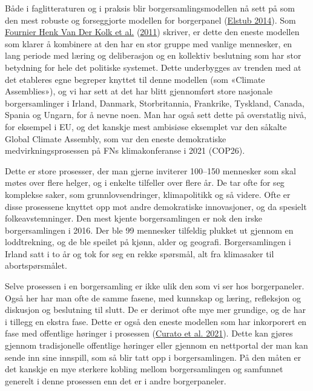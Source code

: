\documentclass[
  12pt,
  a4paper, 12pt]{article}
\begin{document}
Både i faglitteraturen og i praksis blir borgersamlingsmodellen nå sett på som den mest robuste og forseggjorte modellen for borgerpanel (\protect\hyperlink{ref-elstub_mini-publics_2014}{Elstub 2014}). Som \protect\hyperlink{ref-fournier_henk_van_der_kolk_when_2011}{Fournier Henk Van Der Kolk et al.} (\protect\hyperlink{ref-fournier_henk_van_der_kolk_when_2011}{2011}) skriver, er dette den eneste modellen som klarer å kombinere at den har en stor gruppe med vanlige mennesker, en lang periode med læring og deliberasjon og en kollektiv beslutning som har stor betydning for hele det politiske systemet. Dette underbygges av trenden med at det etableres egne begreper knyttet til denne modellen (som «Climate Assemblies»), og vi har sett at det har blitt gjennomført store nasjonale borgersamlinger i Irland, Danmark, Storbritannia, Frankrike, Tyskland, Canada, Spania og Ungarn, for å nevne noen. Man har også sett dette på overstatlig nivå, for eksempel i EU, og det kanskje mest ambisiøse eksemplet var den såkalte Global Climate Assembly, som var den eneste demokratiske medvirkningsprosessen på FNs klimakonferanse i 2021 (COP26).

Dette er store prosesser, der man gjerne inviterer 100--150 mennesker som skal møtes over flere helger, og i enkelte tilfeller over flere år. De tar ofte for seg komplekse saker, som grunnlovsendringer, klimapolitikk og så videre. Ofte er disse prosessene knyttet opp mot andre demokratiske innovasjoner, og da spesielt folkeavstemninger. Den mest kjente borgersamlingen er nok den irske borgersamlingen i 2016. Der ble 99 mennesker tilfeldig plukket ut gjennom en loddtrekning, og de ble speilet på kjønn, alder og geografi. Borgersamlingen i Irland satt i to år og tok for seg en rekke spørsmål, alt fra klimasaker til abortspørsmålet.

Selve prosessen i en borgersamling er ikke ulik den som vi ser hos borgerpaneler. Også her har man ofte de samme fasene, med kunnskap og læring, refleksjon og diskusjon og beslutning til slutt. De er derimot ofte mye mer grundige, og de har i tillegg en ekstra fase. Dette er også den eneste modellen som har inkorporert en fase med offentlige høringer i prosessen (\protect\hyperlink{ref-curato_deliberative_2021}{Curato et al. 2021}). Dette kan gjøres gjennom tradisjonelle offentlige høringer eller gjennom en nettportal der man kan sende inn sine innspill, som så blir tatt opp i borgersamlingen. På den måten er det kanskje en mye sterkere kobling mellom borgersamlingen og samfunnet generelt i denne prosessen enn det er i andre borgerpaneler.
\end{document}
